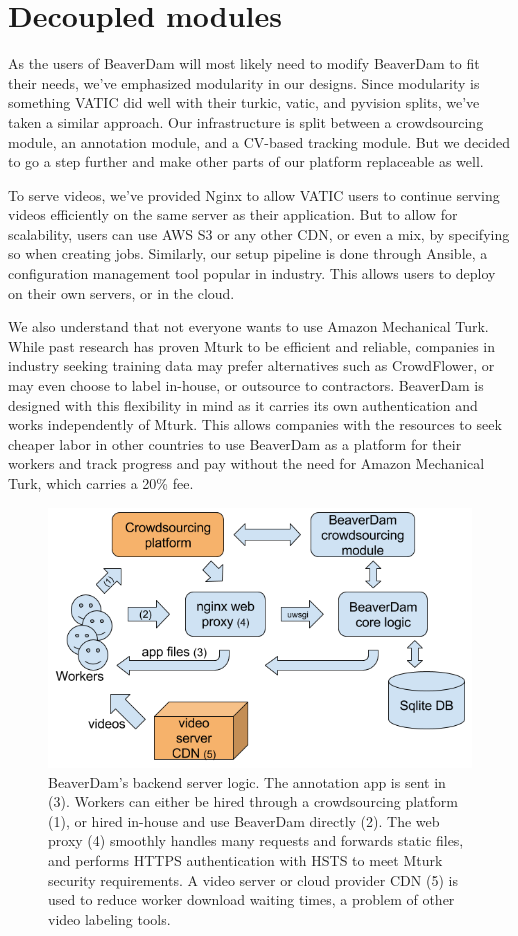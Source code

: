 \section{Decoupled modules}

As the users of BeaverDam will most likely need to modify BeaverDam to fit their needs,
we've emphasized modularity in our designs.
Since modularity is something VATIC did well with their turkic, vatic, and pyvision splits,
we've taken a similar approach.
Our infrastructure is split between a crowdsourcing module, an annotation module, and a CV-based tracking module.
But we decided to go a step further and make other parts of our platform replaceable as well.

To serve videos, we've provided Nginx to allow VATIC users to continue serving videos efficiently on the same server as their application.
But to allow for scalability, users can use AWS S3 or any other CDN, or even a mix, by specifying so when creating jobs.
Similarly, our setup pipeline is done through Ansible, a configuration management tool popular in industry.
This allows users to deploy on their own servers, or in the cloud.

We also understand that not everyone wants to use Amazon Mechanical Turk.
While past research has proven Mturk to be efficient and reliable,
companies in industry seeking training data may prefer alternatives such as CrowdFlower,
or may even choose to label in-house, or outsource to contractors.
BeaverDam is designed with this flexibility in mind as it carries its own authentication and works independently of Mturk.
This allows companies with the resources to seek cheaper labor in other countries to use BeaverDam as a platform for their workers
and track progress and pay without the need for Amazon Mechanical Turk, which carries a 20\% fee.

\begin{figure}[h]
\includegraphics[width=14cm]{figs/backend.png}
\centering
\caption{BeaverDam's backend server logic. The annotation app is sent in (3). Workers can either be hired through a crowdsourcing platform (1), or hired in-house and use BeaverDam directly (2). The web proxy (4) smoothly handles many requests and forwards static files, and performs HTTPS authentication with HSTS to meet Mturk security requirements. A video server or cloud provider CDN (5) is used to reduce worker download waiting times, a problem of other video labeling tools.}
\end{figure}

